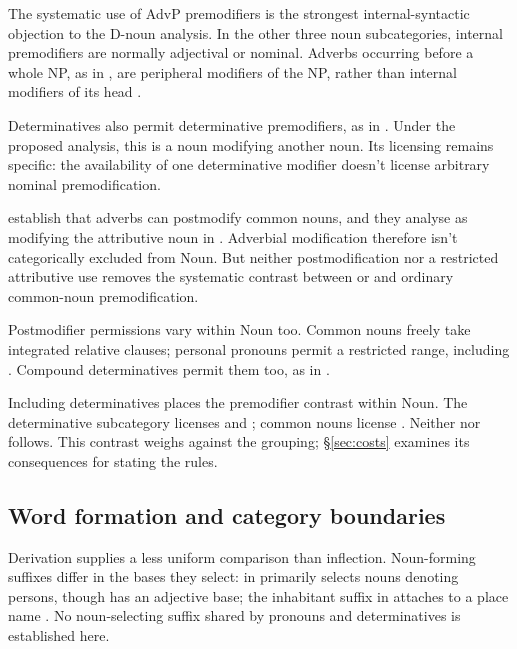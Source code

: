 \documentclass[12pt]{article}
\begin{document}
The systematic use of AdvP premodifiers is the strongest internal-syntactic objection to the D-noun analysis. In the other three noun subcategories, internal premodifiers are normally adjectival or nominal. Adverbs occurring before a whole NP, as in , are peripheral modifiers of the NP, rather than internal modifiers of its head \citep[430--431]{huddleston2002}.

Determinatives also permit determinative premodifiers, as in  \citep[393]{huddleston2002}. Under the proposed analysis, this is a noun modifying another noun. Its licensing remains specific: the availability of one determinative modifier doesn't license arbitrary nominal premodification.

\textcite[42--47]{payne2010} establish that adverbs can postmodify common nouns, and they analyse  as modifying the attributive noun  in  \citep[p.~75, n.~3]{payne2010}. Adverbial modification therefore isn't categorically excluded from Noun. But neither postmodification nor a restricted attributive use removes the systematic contrast between  or  and ordinary common-noun premodification.

Postmodifier permissions vary within Noun too. Common nouns freely take integrated relative clauses; personal pronouns permit a restricted range, including  \citep[430]{huddleston2002}. Compound determinatives permit them too, as in  \citep[423--424]{huddleston2002}.

Including determinatives places the premodifier contrast within Noun. The determinative subcategory licenses  and ; common nouns license . Neither  nor  follows. This contrast weighs against the grouping; §\ref{sec:costs} examines its consequences for stating the rules.

\subsection{Word formation and category boundaries}\label{sec:word-formation}

Derivation supplies a less uniform comparison than inflection. Noun-forming suffixes differ in the bases they select:  in  primarily selects nouns denoting persons, though  has an adjective base; the inhabitant suffix  in  attaches to a place name \citep[Ch.~19, §§5.6.2(b), 5.7.2(k)]{huddleston2002}. No noun-selecting suffix shared by pronouns and determinatives is established here.
\end{document}
